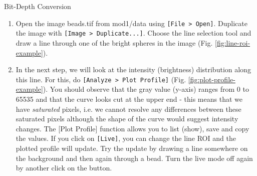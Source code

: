 \newpage
\begin{taskbox}{Bit-Depth Conversion}
\begin{enumerate}
	\item Open the image beads.tif from mod1/data using \texttt{[File > Open]}. Duplicate the image with \texttt{[Image > Duplicate...]}. Choose the line selection tool and draw a line through one of the bright spheres in the image (Fig. \ref{fig:line-roi-example}).	
	
	\begin{minipage}[t]{\linewidth}
		\begin{center}
		\medskip
		\label{fig:line-roi-example}
		\end{center}
	\end{minipage}
	
	\item In the next step, we will look at the intensity (brightness) distribution along this line. For this, do \texttt{[Analyze > Plot Profile]} (Fig. \ref{fig:plot-profile-example}). You should observe that the gray value (y-axis) ranges from 0 to 65535 and that the curve looks cut at the upper end - this means that we have \emph{saturated} pixels, i.e. we cannot resolve any differences between these saturated pixels although the shape of the curve would suggest intensity changes. The [Plot Profile] function allows you to list (show), save and copy the values. If you click on \texttt{[Live]}, you can change the line ROI and the plotted profile will update. Try the update by drawing a line somewhere on the background and then again through a bead. Turn the live mode off again by another click on the button. 


\end{enumerate}
\end{taskbox}
